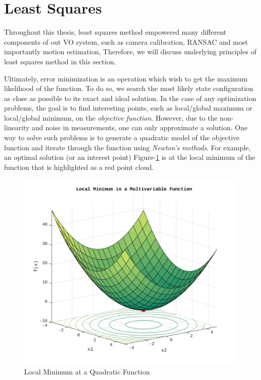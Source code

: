 \documentclass[a4paper]{report}
\numberwithin{figure}{section}
\begin{document}
\section{Least Squares}\label{sc_least_squares}

Throughout this thesis, least squares method empowered many different components 
of out VO system, 
such as camera calibration, RANSAC and most importantly motion estimation, 
Therefore, we will discuss underlying principles of least squares method in this section.

Ultimately, error minimization is an 
operation which wish to get the maximum likelihood of the function. To do so,
we search the most
likely state configuration as close as possible to its exact and ideal solution. 
In the case of any optimization problems,
the goal is to find interesting points, such as local/global
maximum or local/global minimum, on the \textit{objective}
\textit{function}. However, due to the
non-linearity and noise in measurements, one can only approximate a solution.
One way to solve such problems is to generate a quadratic model of 
the objective function and iterate
through the function using \textit{Newton's methods}. 
For example,
an optimal solution (or an interest point)
Figure-\ref{fig:lsq_multivariable_function_example} is at the local
minimum of the function that is highlighted as a red point cloud.

\begin{figure}[H]
	\centering
	\includegraphics[width=\linewidth,natwidth=640,natheight=640]
	{fig/lsq_multivariable_function_example.jpg}
	\caption{Local Minimum at a Quadratic Function}
	\label{fig:lsq_multivariable_function_example}
\end{figure}
\end{document}
